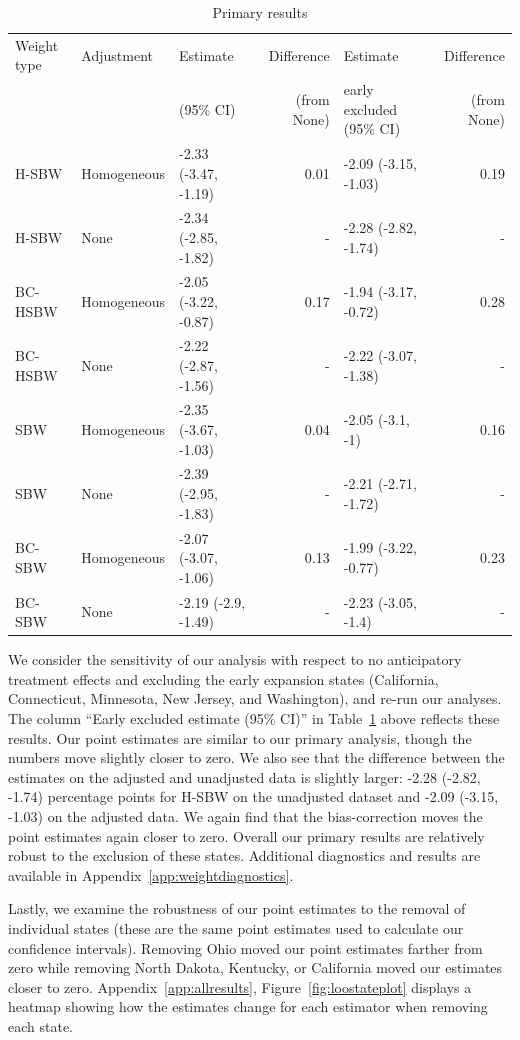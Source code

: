 \documentclass[aoas]{imsart}
\theoremstyle{plain}
\theoremstyle{remark}
\begin{document}
\begin{table}[ht]
\caption{Primary results}\label{tab:mainresults}
\begin{tabular}{lllrlr}
  \hline
Weight type & Adjustment & Estimate  & Difference & Estimate  & Difference\\ 
 &  & (95\% CI) & (from None) & early excluded (95\% CI) & (from None) \\
  \hline
H-SBW & Homogeneous & -2.33 (-3.47, -1.19) & 0.01 & -2.09 (-3.15, -1.03) & 0.19 \\ 
  H-SBW & None & -2.34 (-2.85, -1.82) & - & -2.28 (-2.82, -1.74) & - \\ 
  BC-HSBW & Homogeneous & -2.05 (-3.22, -0.87) & 0.17 & -1.94 (-3.17, -0.72) & 0.28 \\ 
  BC-HSBW & None & -2.22 (-2.87, -1.56) & - & -2.22 (-3.07, -1.38) & - \\ 
  SBW & Homogeneous & -2.35 (-3.67, -1.03) & 0.04 & -2.05 (-3.1, -1) & 0.16 \\ 
  SBW & None & -2.39 (-2.95, -1.83) & - & -2.21 (-2.71, -1.72) & - \\ 
  BC-SBW & Homogeneous & -2.07 (-3.07, -1.06) & 0.13 & -1.99 (-3.22, -0.77) & 0.23 \\ 
  BC-SBW & None & -2.19 (-2.9, -1.49) & - & -2.23 (-3.05, -1.4) & - \\ 
   \hline
\end{tabular}
\end{table}

We consider the sensitivity of our analysis with respect to no anticipatory treatment effects and excluding the early expansion states (California, Connecticut, Minnesota, New Jersey, and Washington), and re-run our analyses. The column ``Early excluded estimate (95\% CI)'' in Table~\ref{tab:mainresults} above reflects these results. Our point estimates are similar to our primary analysis, though the numbers move slightly closer to zero. We also see that the difference between the estimates on the adjusted and unadjusted data is slightly larger: -2.28 (-2.82, -1.74) percentage points for H-SBW on the unadjusted dataset and -2.09 (-3.15, -1.03) on the adjusted data. We again find that the bias-correction moves the point estimates again closer to zero. Overall our primary results are relatively robust to the exclusion of these states. Additional diagnostics and results are available in Appendix~\ref{app:weightdiagnostics}.

Lastly, we examine the robustness of our point estimates to the removal of individual states (these are the same point estimates used to calculate our confidence intervals). Removing Ohio moved our point estimates farther from zero while removing North Dakota, Kentucky, or California moved our estimates closer to zero. Appendix~\ref{app:allresults}, Figure~\ref{fig:loostateplot} displays a heatmap showing how the estimates change for each estimator when removing each state.
\end{document}
